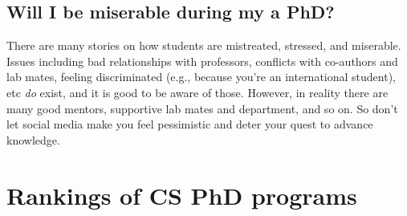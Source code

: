 \documentclass[oneside,11pt]{memoir}
\begin{document}
\section{Will I be miserable during my a PhD?}\label{sec:happy}
There are many stories on how students are mistreated, stressed, and miserable. Issues including bad relationships with professors, conflicts with co-authors and lab mates, feeling discriminated (e.g., because you're an international student), etc \emph{do} exist, and it is good to be aware of those.  However, in reality there are many good mentors, supportive lab mates and department, and so on.  So don't let social media make you feel pessimistic and deter your quest to advance knowledge.

\appendix

\chapter{Rankings of CS PhD programs}\label{sec:ranking}
\end{document}
